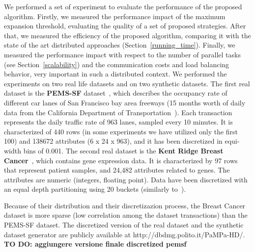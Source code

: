 We performed a set of experiment to evaluate the performance of the proposed algorithm. Firstly, we measured the performance impact of the maximum expansion threshold, evaluating the quality of a set of proposed strategies. After that, we measured the efficiency of the proposed algorithm,
comparing it with the state of the art distributed approaches (Section~\ref{running_time}). Finally, we measured the performance impact with respect to  the number of parallel tasks (see Section~\ref{scalability}) 
and the communication costs and load balancing behavior,
very important in such a distributed context.
We performed the experiments on two real life datasets and on two
synthetic datasets.
The first real dataset is the \textbf{PEMS-SF} dataset~\cite{uci}, 
which describes the occupancy rate of different car lanes of San Francisco bay area freeways (15 months worth of daily data from the California Department of Transportation~\cite{pems}).
Each transaction represents the daily traffic rate of 963 lanes, sampled every 10 minutes.
It is characterized of 440 rows (in some experiments we have utilized only the first 100) and 138672 attributes (6 x 24 x 963), and it has been discretized in
equi-width bins of 0.001.
The second real dataset is the \textbf{Kent Ridge Breast Cancer}~\cite{breast_cancer_dataset}, which contains gene expression data.
It is characterized by 97 rows that represent patient samples, and
24,482 attributes related to genes. The attributes are numeric (integers, floating point).
Data have been discretized with an equal depth partitioning
using 20 buckets (similarly to~\cite{Zaki_Carpenter}).

Because of their distribution and their discretizazion process, the Breast Cancer dataset is more sparse (low correlation among the dataset transactions) than the PEMS-SF dataset. 
The discretized version of the real dataset and the synthetic dataset generator
are publicly available at http://dbdmg.polito.it/PaMPa-HD/. \textbf{TO DO: aggiungere versione finale discretized pemsf}




